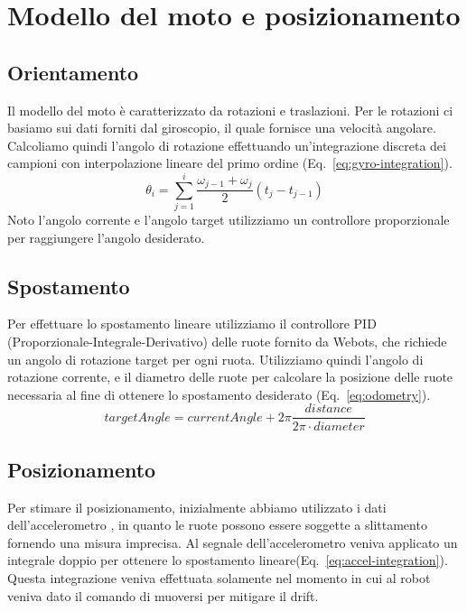 \documentclass[a4paper]{article}
\begin{document}
	\section{Modello del moto e posizionamento}\label{sec:Modello-del-moto-e-posizionamento} 
	\subsection{Orientamento}\label{subsec:Orientamento}
	Il modello del moto è caratterizzato da rotazioni e traslazioni. Per le
	rotazioni ci basiamo sui dati forniti dal giroscopio, il quale fornisce una
	velocità angolare. Calcoliamo quindi l'angolo di rotazione effettuando
	un'integrazione discreta dei campioni con interpolazione lineare del primo
	ordine (Eq.~\ref{eq:gyro-integration}).  
	\begin{equation}\label{eq:gyro-integration}
		\theta_i = \sum_{j=1}^i \frac{\omega _{j-1}+\omega _j}{2} \left( t_j-t_{j-1} \right) 
	\end{equation}
	Noto l'angolo corrente e l'angolo target utilizziamo un controllore
	proporzionale per raggiungere l'angolo desiderato.
	
	\subsection{Spostamento}\label{subsec:Spostamento}
	Per effettuare lo spostamento lineare utilizziamo il controllore PID
	(Proporzionale-Integrale-Derivativo) delle ruote fornito da Webots, che
	richiede un angolo di rotazione target per ogni ruota. Utilizziamo quindi
	l'angolo di rotazione corrente, e il diametro delle ruote per calcolare la
	posizione delle ruote necessaria al fine di ottenere lo spostamento
	desiderato (Eq.~\ref{eq:odometry}).
	\begin{equation}\label{eq:odometry}
	targetAngle =
	currentAngle+2\pi\frac    {distance}
					{2\pi \cdot diameter}
	\end{equation}
	
	\subsection{Posizionamento}\label{subsec:Posizionamento}
	Per stimare il posizionamento, inizialmente abbiamo utilizzato i dati
	dell'accelerometro \cite{positioning}, in quanto le ruote possono essere
	soggette a slittamento fornendo una misura imprecisa. Al segnale
	dell'accelerometro veniva applicato un integrale doppio per ottenere lo
	spostamento lineare(Eq.~\ref{eq:accel-integration}). Questa integrazione
	veniva effettuata solamente nel momento in cui al robot veniva dato il
	comando di muoversi per mitigare il drift.
\end{document}

